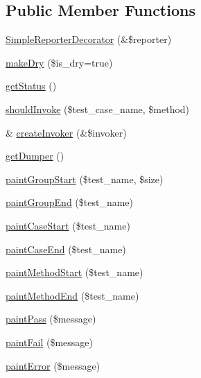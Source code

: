 \subsection*{Public Member Functions}
\begin{DoxyCompactItemize}
\item 
\hyperlink{class_simple_reporter_decorator_af6326eea5974fd37bfe2dd5e3a58fcf5}{SimpleReporterDecorator} (\&\$reporter)
\item 
\hyperlink{class_simple_reporter_decorator_a8415a96af49c4f0a544319d6f81b85a4}{makeDry} (\$is\_\-dry=true)
\item 
\hyperlink{class_simple_reporter_decorator_a5270362707f6df0d37eb9f4b9d4ec339}{getStatus} ()
\item 
\hyperlink{class_simple_reporter_decorator_a571852c647ef03d0486353aed21d79f9}{shouldInvoke} (\$test\_\-case\_\-name, \$method)
\item 
\& \hyperlink{class_simple_reporter_decorator_a9c002b61072edecc11603dfb41bb00a5}{createInvoker} (\&\$invoker)
\item 
\hyperlink{class_simple_reporter_decorator_ae6ed25f3a3cda7aab6a71ddc77b00695}{getDumper} ()
\item 
\hyperlink{class_simple_reporter_decorator_a2e64b5bc09764a866715f80c3f2aeee7}{paintGroupStart} (\$test\_\-name, \$size)
\item 
\hyperlink{class_simple_reporter_decorator_a836e0cd11187140b1646bcd1fee494d1}{paintGroupEnd} (\$test\_\-name)
\item 
\hyperlink{class_simple_reporter_decorator_aa6a8e6c378555a2b30339a3846c98144}{paintCaseStart} (\$test\_\-name)
\item 
\hyperlink{class_simple_reporter_decorator_abf37b2557147287b9c3ca070736ee465}{paintCaseEnd} (\$test\_\-name)
\item 
\hyperlink{class_simple_reporter_decorator_a3877f093e787635206b8e73d626cae81}{paintMethodStart} (\$test\_\-name)
\item 
\hyperlink{class_simple_reporter_decorator_ae8bc09f969225a04c13cf735e72ab2cb}{paintMethodEnd} (\$test\_\-name)
\item 
\hyperlink{class_simple_reporter_decorator_a32a51a21a9b469e284a16b7b98430432}{paintPass} (\$message)
\item 
\hyperlink{class_simple_reporter_decorator_a4dd462fa2d69921c1c4994e31df3be21}{paintFail} (\$message)
\item 
\hyperlink{class_simple_reporter_decorator_ab13238fe02b14c8c115d74c83d69775f}{paintError} (\$message)
\item 

\end{DoxyCompactItemize}
